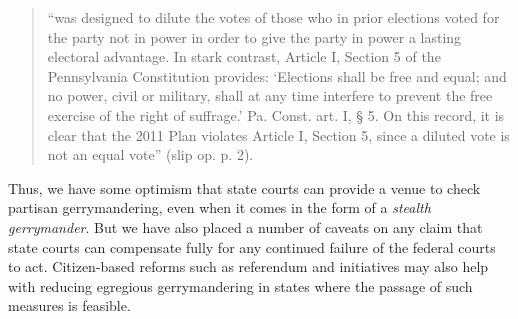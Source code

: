     \begin{quote}
        ``was designed to dilute the votes of those who in prior elections voted for the party not in power in order to give the party in power a lasting electoral advantage. In stark contrast, Article I, Section 5 of the Pennsylvania Constitution provides: ‘Elections shall be free and equal; and no power, civil or military, shall at any time interfere to prevent the free exercise of the right of suffrage.’ Pa. Const. art. I, § 5. On this record, it is clear that the 2011 Plan violates Article I, Section 5, since a diluted vote is not an equal vote'' (slip op. p. 2).
    \end{quote}
\par
    Thus, we have some optimism that state courts can provide a venue to check partisan gerrymandering, even when it comes in the form of a \textit{stealth gerrymander}. But we have also placed a number of caveats on any claim that state courts can compensate fully for any continued failure of the federal courts to act. Citizen-based reforms such as referendum and initiatives may also help with reducing egregious gerrymandering in states where the passage of such measures is feasible.
